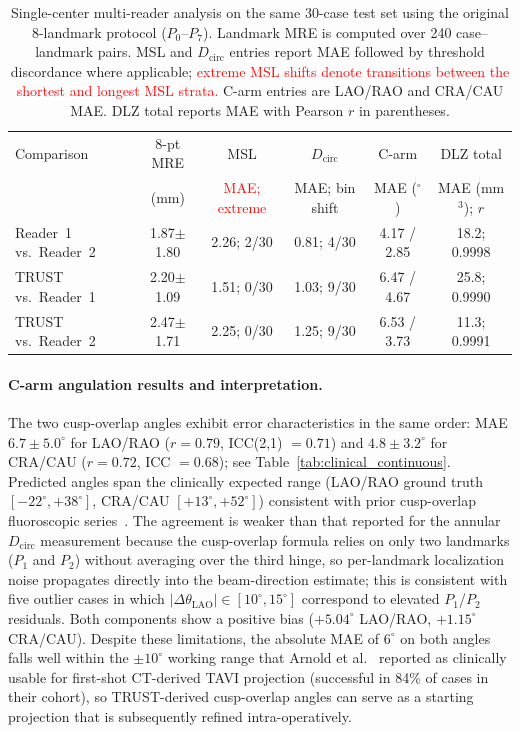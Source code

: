 \documentclass[conference]{IEEEtran}
\begin{document}
\begin{table}[!t]
\centering
\color{red}
\caption{Single-center multi-reader analysis on the same 30-case test set using the original 8-landmark protocol ($P_0$--$P_7$). Landmark MRE is computed over 240 case--landmark pairs. MSL and $D_{\text{circ}}$ entries report MAE followed by threshold discordance where applicable; \textcolor{red}{extreme MSL shifts denote transitions between the shortest and longest MSL strata.} C-arm entries are LAO/RAO and CRA/CAU MAE. DLZ total reports MAE with Pearson $r$ in parentheses.}
\label{tab:multi_reader}
\setlength{\tabcolsep}{4pt}
\footnotesize
\begin{tabular}{l c c c c c}
\toprule
Comparison & 8-pt MRE & MSL & $D_{\text{circ}}$ & C-arm & DLZ total \\
 & (mm) & \textcolor{red}{MAE; extreme} & MAE; bin shift & MAE ($^\circ$) & MAE (mm$^3$); $r$ \\
\midrule
Reader~1 vs.\ Reader~2 & 1.87$\pm$1.80 & 2.26; 2/30 & 0.81; 4/30 & 4.17 / 2.85 & 18.2; 0.9998 \\
TRUST vs.\ Reader~1    & 2.20$\pm$1.09 & 1.51; 0/30 & 1.03; 9/30 & 6.47 / 4.67 & 25.8; 0.9990 \\
TRUST vs.\ Reader~2    & 2.47$\pm$1.71 & 2.25; 0/30 & 1.25; 9/30 & 6.53 / 3.73 & 11.3; 0.9991 \\
\bottomrule
\end{tabular}
\end{table}

\paragraph{C-arm angulation results and interpretation.}
The two cusp-overlap angles exhibit error characteristics in the same order: MAE $6.7 \pm 5.0^\circ$ for LAO/RAO ($r = 0.79$, ICC(2,1) $= 0.71$) and $4.8 \pm 3.2^\circ$ for CRA/CAU ($r = 0.72$, ICC $= 0.68$); see Table~\ref{tab:clinical_continuous}. Predicted angles span the clinically expected range (LAO/RAO ground truth $[-22^\circ, +38^\circ]$, CRA/CAU $[+13^\circ, +52^\circ]$) consistent with prior cusp-overlap fluoroscopic series~\cite{Pascual2022_cusp_overlap}. The agreement is weaker than that reported for the annular $D_{\text{circ}}$ measurement because the cusp-overlap formula relies on only two landmarks ($P_1$ and $P_2$) without averaging over the third hinge, so per-landmark localization noise propagates directly into the beam-direction estimate; this is consistent with five outlier cases in which $|\Delta\theta_{\text{LAO}}| \in [10^\circ, 15^\circ]$ correspond to elevated $P_1$/$P_2$ residuals. Both components show a positive bias ($+5.04^\circ$ LAO/RAO, $+1.15^\circ$ CRA/CAU). Despite these limitations, the absolute MAE of $6^\circ$ on both angles falls well within the $\pm 10^\circ$ working range that Arnold et al.~\cite{Arnold2012_carm_projection} reported as clinically usable for first-shot CT-derived TAVI projection (successful in 84\% of cases in their cohort), so TRUST-derived cusp-overlap angles can serve as a starting projection that is subsequently refined intra-operatively.
\end{document}
